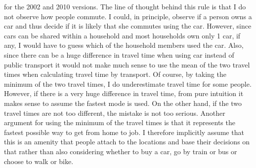 for the 2002 and 2010 versions. The line of thought behind this rule is that I do not observe how people commute. I could, in principle, observe if a person owns a car and thus decide if it is likely that she commutes using the car. However, since cars can be shared within a household and most households own only 1 car, if any, I would have to guess which of the household members used the car. Also, since there can be a huge difference in travel time when using car instead of public transport it would not make much sense to use the mean of the two travel times when calculating travel time by transport. Of course, by taking the minimum of the two travel times, I do underestimate travel time for some people. However, if there is a very huge difference in travel time, from pure intuition it makes sense to assume the fastest mode is used. On the other hand, if the two travel times are not too different, the mistake is not too serious. Another argument for using the minimum of the travel times is that it represents the fastest possible way to get from home to job. I therefore implicitly assume that this is an amenity that people attach to the locations and base their decisions on that rather than also considering whether to buy a car, go by train or bus or choose to walk or bike.

